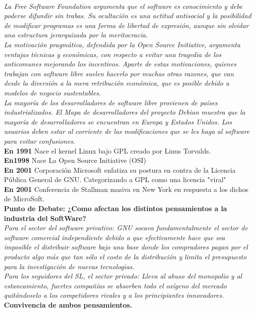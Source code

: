 {\it 
\\
La Free Software Foundation argumenta que el software es conocimiento y debe poderse difundir sin trabas. Su ocultación es una actitud antisocial y la posibilidad de modificar programas es una forma de libertad de expresión, aunque sin olvidar una estructura jerarquizada por la meritocracia.
\\
La motivación pragmática, defendida por la Open Source Initiative, argumenta ventajas técnicas y económicas, con respecto a evitar una tragedia de los anticomunes mejorando los incentivos.
Aparte de estas motivaciones, quienes trabajan con software libre suelen hacerlo por muchas otras razones, que van desde la diversión a la mera retribución económica, que es posible debido a modelos de negocio sustentables.
\\
La mayoría de los desarrolladores de software libre provienen de países industrializados. El Mapa de desarrolladores del proyecto Debian muestra que la mayoría de desarrolladores se encuentran en Europa y Estados Unidos.
Los usuarios deben estar al corriente de las modificaciones que se les haga al software para evitar confusiones.
}
\\
{\bf En 1991} Nace el kernel Linux bajo  GPL creado por Linus Torvalds.
\\
{\bf En1998} Nace La Open Source Initiative (OSI)
\\
{\bf En 2001} Corporación Microsoft enfatiza su postura en contra de la Licencia Pública General de GNU.
Categorizando a GPL como una licencia "viral"
\\
{\bf En 2001} Conferencia de Stallman masiva en New York en respuesta a los dichos de MicroSoft.
\\
{\bf Punto de Debate: ¿Como afectan los distintos pensamientos a la industria del SoftWare? }
{\it 
\\
\emph{Para el sector del software privativo:}
GNU socava fundamentalmente el sector de software comercial independiente debido a que efectivamente hace que sea imposible el distribuir software bajo una base donde los compradores pagan por el producto algo más que tan sólo el costo de la distribución y limita el presupuesto para la investigación de nuevas tecnologias.
\\
\emph{Para los seguidores del SL, el sector privado:}
Lleva al abuso del monopolio y al estancamiento, fuertes compañías se absorben todo el oxígeno del mercado quitándoselo a los competidores rivales y a los principiantes innovadores.
}
\\
{\bf Convivencia de ambos pensamientos.}
